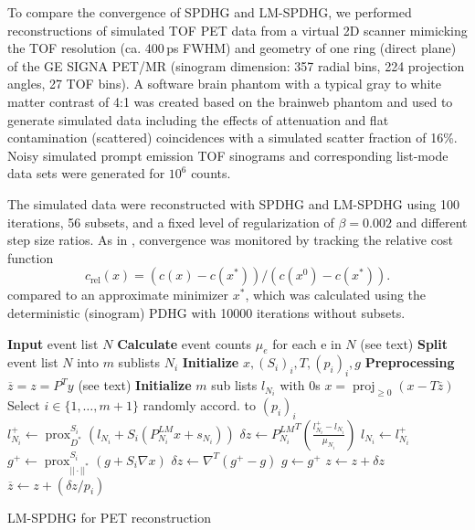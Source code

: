 \documentclass{IEEEtran}
\DeclareMathOperator{\proj}{proj}
\DeclareMathOperator{\prox}{prox}
\begin{document}
To compare the convergence of SPDHG and LM-SPDHG, we performed reconstructions of simulated
TOF PET data from a virtual 2D scanner mimicking the TOF resolution (ca. 400\,ps FWHM) and 
geometry of one ring (direct plane) of the GE SIGNA PET/MR (sinogram dimension: 
357 radial bins, 224 projection angles, 27 TOF bins).
A software brain phantom with a typical gray to white matter contrast of 4:1 was created
based on the brainweb phantom and used to generate simulated data including the effects
of attenuation and flat contamination (scattered) coincidences
with a simulated scatter fraction of 16\%.
Noisy simulated prompt emission TOF sinograms and corresponding list-mode data sets 
were generated for $10^6$ counts.

The simulated data were reconstructed with SPDHG and LM-SPDHG using 100 iterations, 56 subsets,
and a fixed level of regularization of $\beta = 0.002$ and different step size ratios.
As in \cite{Ehrhardt2019}, convergence was monitored by tracking the relative cost function
\[ c_\text{rel}(x) = (c(x) - c(x^*)) / (c(x^0) - c(x^*)). \]
compared to an approximate minimizer $x^*$,
which was calculated using the deterministic (sinogram) PDHG with 10000 iterations without subsets.


\begin{algorithm}[t]
\begin{algorithmic}[1]
\footnotesize
\State \textbf{Input} event list $N$
\State \textbf{Calculate} event counts $\mu_e$ for each e in $N$ (see text)
\State \textbf{Split} event list $N$ into $m$ sublists $N_i$
\State \textbf{Initialize} $x,(S_i)_i,T,(p_i)_i,g$
\State \textbf{Preprocessing} $\overline{z} = z = P^T y$ (see text)
\State \textbf{Initialize} $m$ sub lists $l_{N_i}$ with 0s
\Repeat
	\State $x = \proj_{\geq 0} (x - T \overline{z})$
	\State Select $i \in \{1,\ldots,m+1\}$ randomly accord. to $(p_i)_i$
	  \State $l_{N_i}^+ \gets \prox_{D^*}^{S_i} \left( l_{N_i} + S_i \left(P^{LM}_{N_i} x + s_{N_i} \right) \right)$
	  \State $\delta z \gets {P^{LM}_{N_i}}^T \left(\frac{l_{N_i}^+ - l_{N_i}}{\mu_{N_i}}\right)$
	  \State $l_{N_i} \gets l_{N_i}^+$
  \Else
	  \State $g^+ \gets \prox_{||\cdot||^*}^{S_i} \left( g + S_i \nabla x \right)$
	  \State $\delta z \gets \nabla^T \left(g^+ - g\right)$
	  \State $g \gets g^+$
  \EndIf
	\State $z \gets z + \delta z$
	\State $\overline{z} \gets  z + (\delta z/p_i)$
\State {}
\end{algorithmic}
\caption{LM-SPDHG for PET reconstruction}
\label{alg:lmspdhg}
\end{algorithm}
\end{document}
